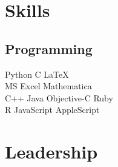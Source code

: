 \documentclass[letterpaper]{deedy-resume} %
\begin{document}
\begin{minipage}[t]{0.39\textwidth}


\section{Skills}

\subsection{Programming}

Python \textbullet{} C \textbullet{} \LaTeX \\
MS Excel \textbullet{} Mathematica\\
C++ \textbullet{} Java \textbullet{} Objective-C \textbullet{} Ruby\\
R \textbullet{} JavaScript \textbullet{} AppleScript\\


\sectionspace %





\section{Leadership}



\end{minipage}
\end{document}
